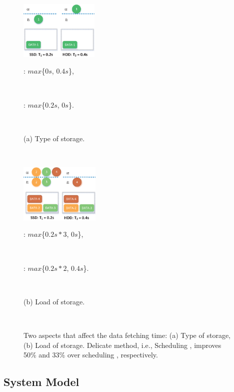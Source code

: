 \documentclass[conference]{IEEEtran}
\begin{document}
\begin{figure}[!t]
\centering
    \begin{minipage}{4.25cm}
        \includegraphics[height = 2.8cm]{fig_example1_8.eps}
        \centerline{\footnotesize{\uppercase\expandafter{} : $max$\{$0s$, $0.4s$\},\quad}}\\
        \centerline{\footnotesize{\uppercase\expandafter{} : $max$\{$0.2s$, $0s$\}.\quad}}\\
         \centerline{(a) Type of storage.}\\
    \end{minipage}
    \begin{minipage}{4.25cm}
        \includegraphics[height = 2.8cm]{fig_example2_6.eps}
        \centerline{\footnotesize{\uppercase\expandafter{} : $max$\{$0.2s*3$, $0s$\},\quad}}\\
        \centerline{\footnotesize{\uppercase\expandafter{} : $max$\{$0.2s*2$, $0.4s$\}.}}\\
         \centerline{(b) Load of storage.\quad}\\
    \end{minipage}
    \vspace{-0.4cm}
    \caption{Two aspects that affect the data fetching time: (a) Type of storage, (b) Load of storage. Delicate method, i.e., Scheduling \uppercase\expandafter{}, improves 50\% and 33\% over scheduling \uppercase\expandafter{}, respectively.}
    \label{Fig:example}
    \vspace{-0.4cm}
\end{figure}

\subsection{System Model}
\end{document}
